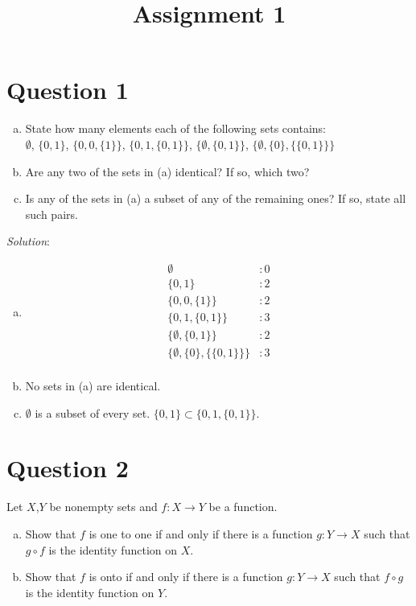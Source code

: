 \documentclass{article}
\title{Assignment 1}
\date{}
\begin{document}

\section*{Question 1}
\begin{enumerate}[(a)]
  \item  State how many elements each of the following sets contains:\\
  $\emptyset$, $\{0, 1\}$, $\{0, 0, \{1\}\}$, $\{0, 1, \{0, 1\}\}$,
  $\{\emptyset, \{0, 1\}\}$, $\{\emptyset, \{0\}, \{\{0, 1\}\}\}$
  \item Are any two of the sets in (a) identical? If so, which two?
  \item Is any of the sets in (a) a subset of any of the remaining ones?
        If so, state all such pairs.
\end{enumerate}

\emph{Solution}:
\begin{enumerate}[(a)]
  \item \begin{align*}
       \emptyset &: 0 \\
       \{0, 1\}  &: 2 \\
       \{0, 0, \{1\}\} &: 2 \\
       \{0, 1, \{0, 1\}\} &: 3 \\
       \{\emptyset, \{0, 1\}\} &: 2 \\
       \{\emptyset, \{0\}, \{\{0, 1\}\}\} &: 3\\
   \end{align*}

   \item No sets in (a) are identical.

   \item $\emptyset$ is a subset of every set.
   $\{0, 1\} \subset \{0, 1, \{0, 1\}\}$.

\end{enumerate}


\section*{Question 2}
Let $X$,$Y$ be nonempty sets and $f : X \to Y$ be a function.
\begin{enumerate}[(a)]
  \item Show that $f$ is one to one if and only if there is a function
        $g: Y \to X$ such that $g \circ f$ is the identity function on $X$.
  \item Show that $f$ is onto if and only if there is a function $g: Y \to X$
        such that $f \circ g$ is the identity function on $Y$.
\end{enumerate}
\end{document}

